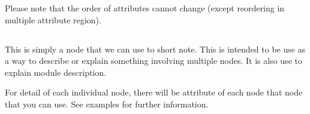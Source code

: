 Please note that the order of attributes cannot change (except reordering in multiple attribute region).



\subsection{\kComment {}}
This is simply a node that we can use to short note. This is intended to be use as a way to describe or explain something involving multiple nodes. It is also use to explain module description.

For detail of each individual node, there will be \kComment attribute of each node that node that you can use. See examples for further information.

